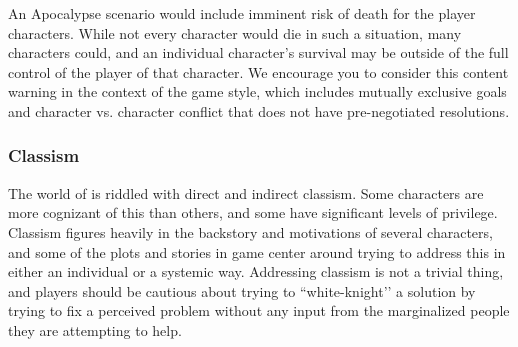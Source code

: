 \documentclass[sheet]{GL2020}
\begin{document}
An Apocalypse scenario would include imminent risk of death for the player characters. While not every character would die in such a situation, many characters could, and an individual character's survival may be outside of the full control of the player of that character. We encourage you to consider this content warning in the context of the game style, which includes mutually exclusive goals and character vs. character conflict that does not have pre-negotiated resolutions.

\subsubsection{Classism}
The world of \pEarth{} is riddled with direct and indirect classism. Some characters are more cognizant of this than others, and some have significant levels of privilege. Classism figures heavily in the backstory and motivations of several characters, and some of the plots and stories in game center around trying to address this in either an individual or a systemic way. Addressing classism is not a trivial thing, and players should be cautious about trying to ``white-knight'’ a solution by trying to fix a perceived problem without any input from the marginalized people they are attempting to help.
\end{document}
